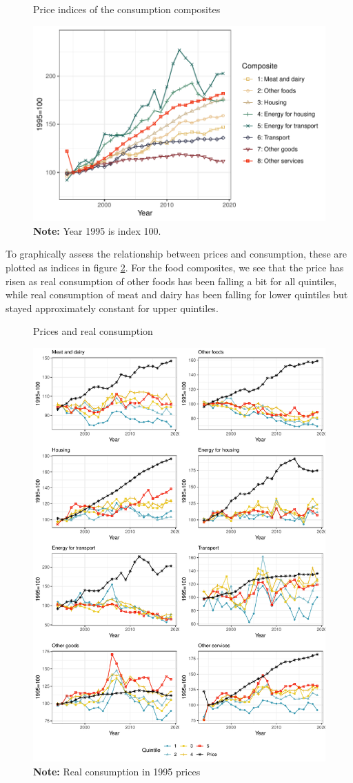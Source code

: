 \begin{figure}[H]
\centering
\caption{Price indices of the consumption composites }
\label{pricesfigure}
\includegraphics[width=.8\textwidth]{Figures/priceplot.pdf}
\captionsetup{singlelinecheck=off,size=scriptsize}
\setlength{\captionmargin}{10pt}
\caption*{
\textbf{Note:} Year 1995 is index 100.}
\end{figure}

To graphically assess the relationship between prices and consumption, these are plotted as indices in figure \ref{priceandrealcons}. For the food composites, we see that the price has risen as real consumption of other foods has been falling a bit for all quintiles, while real consumption of meat and dairy has been falling for lower quintiles but stayed approximately constant for upper quintiles. 


\begin{figure}[H]
\centering
\caption{Prices and real consumption}
\label{priceandrealcons}
\includegraphics[width=.8\textwidth]{Figures/indexpricecons.pdf}
\captionsetup{singlelinecheck=off,size=scriptsize}
\setlength{\captionmargin}{10pt}
\caption*{
\textbf{Note:} Real consumption in 1995 prices}
\end{figure}

